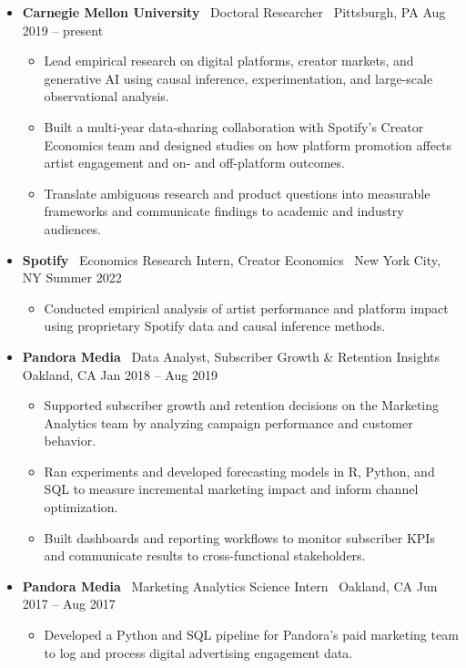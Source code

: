 \documentclass[10pt,letterpaper]{article}
\newcommand{\sep}{{\color{gray}\,\textbullet\,\,}}
\begin{document}
\begin{itemize}[leftmargin=0pt, label={}]
\item \textbf{Carnegie Mellon University} \sep Doctoral Researcher \sep Pittsburgh, PA \hfill Aug 2019 -- present
  \begin{itemize}
  \item Lead empirical research on digital platforms, creator markets, and generative AI using causal inference, experimentation, and large-scale observational analysis.
  \item Built a multi-year data-sharing collaboration with Spotify's Creator Economics team and designed studies on how platform promotion affects artist engagement and on- and off-platform outcomes.
  \item Translate ambiguous research and product questions into measurable frameworks and communicate findings to academic and industry audiences.
  \end{itemize}
\item \textbf{Spotify} \sep Economics Research Intern, Creator Economics \sep New York City, NY \hfill Summer 2022
  \begin{itemize}
  \item Conducted empirical analysis of artist performance and platform impact using proprietary Spotify data and causal inference methods.
  \end{itemize}
\item \textbf{Pandora Media} \sep Data Analyst, Subscriber Growth \& Retention Insights \sep Oakland, CA \hfill Jan 2018 -- Aug 2019
  \begin{itemize}
  \item Supported subscriber growth and retention decisions on the Marketing Analytics team by analyzing campaign performance and customer behavior.
  \item Ran experiments and developed forecasting models in R, Python, and SQL to measure incremental marketing impact and inform channel optimization.
  \item Built dashboards and reporting workflows to monitor subscriber KPIs and communicate results to cross-functional stakeholders.
  \end{itemize}
\item \textbf{Pandora Media} \sep Marketing Analytics Science Intern \sep Oakland, CA \hfill Jun 2017 -- Aug 2017
  \begin{itemize}
  \item Developed a Python and SQL pipeline for Pandora's paid marketing team to log and process digital advertising engagement data.
  \end{itemize}
\end{itemize}
\end{document}
